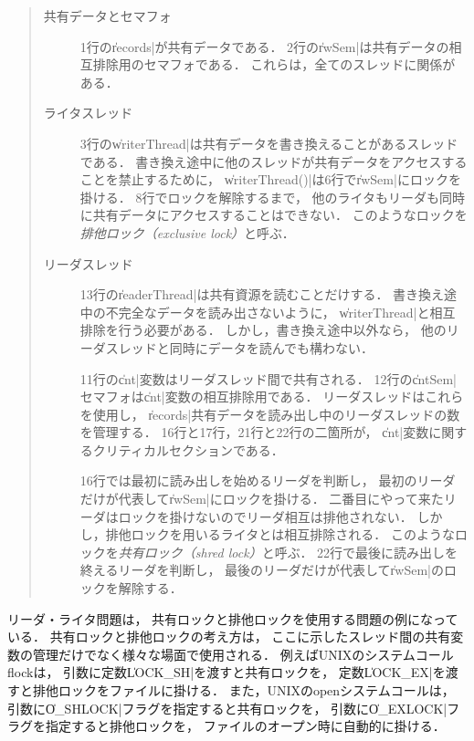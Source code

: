 \begin{quote}
  \begin{description}
  \item [共有データとセマフォ]
    1行の\|records|が共有データである．
    2行の\|rwSem|は共有データの相互排除用のセマフォである．
    これらは，全てのスレッドに関係がある．

  \item [ライタスレッド]
    3行の\|writerThread|は共有データを書き換えることがあるスレッドである．
    書き換え途中に他のスレッドが共有データをアクセスすることを禁止するために，
    \|writerThread()|は6行で\|rwSem|にロックを掛ける．
    8行でロックを解除するまで，
    他のライタもリーダも同時に共有データにアクセスすることはできない．
    このようなロックを\emph{排他ロック（exclusive lock）}と呼ぶ．

  \item [リーダスレッド]
    13行の\|readerThread|は共有資源を読むことだけする．
    書き換え途中の不完全なデータを読み出さないように，
    \|writerThread|と相互排除を行う必要がある．
    しかし，書き換え途中以外なら，
    他のリーダスレッドと同時にデータを読んでも構わない．

    11行の\|cnt|変数はリーダスレッド間で共有される．
    12行の\|cntSem|セマフォは\|cnt|変数の相互排除用である．
    リーダスレッドはこれらを使用し，
    \|records|共有データを読み出し中のリーダスレッドの数を管理する．
    16行と17行，21行と22行の二箇所が，
    \|cnt|変数に関するクリティカルセクションである．

    16行では最初に読み出しを始めるリーダを判断し，
    最初のリーダだけが代表して\|rwSem|にロックを掛ける．
    二番目にやって来たリーダはロックを掛けないのでリーダ相互は排他されない．
    しかし，排他ロックを用いるライタとは相互排除される．
    このようなロックを\emph{共有ロック（shred lock）}と呼ぶ．
    22行で最後に読み出しを終えるリーダを判断し，
    最後のリーダだけが代表して\|rwSem|のロックを解除する．
  \end{description}
\end{quote}

リーダ・ライタ問題は，
共有ロックと排他ロックを使用する問題の例になっている．
共有ロックと排他ロックの考え方は，
ここに示したスレッド間の共有変数の管理だけでなく様々な場面で使用される．
例えばUNIXのシステムコールflockは，
引数に定数\|LOCK_SH|を渡すと共有ロックを，
定数\|LOCK_EX|を渡すと排他ロックをファイルに掛ける．
また，UNIXのopenシステムコールは，
引数に\|O_SHLOCK|フラグを指定すると共有ロックを，
引数に\|O_EXLOCK|フラグを指定すると排他ロックを，
ファイルのオープン時に自動的に掛ける．

